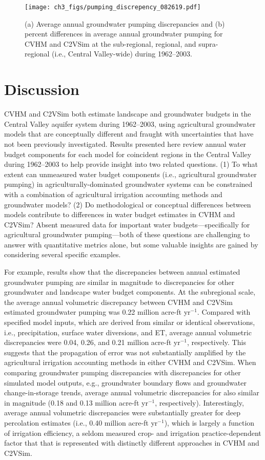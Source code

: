 \begin{figure}[ht!]
\centerline{\texttt{[image: ch3\_figs/pumping\_discrepency\_082619.pdf]}}
\caption{(a) Average annual groundwater pumping discrepancies and (b) percent differences in average annual groundwater pumping for CVHM and C2VSim at the sub-regional, regional, and supra-regional (i.e., Central Valley-wide) during 1962--2003.}
\label{fig:ch3_GW_pumping}
\end{figure}

\section{Discussion}

CVHM and C2VSim both estimate landscape and groundwater budgets in the Central Valley aquifer system during 1962--2003, using agricultural groundwater models that are conceptually different and fraught with uncertainties that have not been previously investigated. Results presented here review annual water budget components for each model for coincident regions in the Central Valley during 1962--2003 to help provide insight into two related questions. (1) To what extent can unmeasured water budget components (i.e., agricultural groundwater pumping) in agriculturally-dominated groundwater systems can be constrained with a combination of agricultural irrigation accounting methods and groundwater models? (2) Do methodological or conceptual differences between models contribute to differences in water budget estimates in CVHM and C2VSim? Absent measured data for important water budgets---specifically for agricultural groundwater pumping---both of these questions are challenging to answer with quantitative metrics alone, but some valuable insights are gained by considering several specific examples.

For example, results show that the discrepancies between annual estimated groundwater pumping are similar in magnitude to discrepancies for other groundwater and landscape water budget components. At the subregional scale, the average annual volumetric discrepancy between CVHM and C2VSim estimated groundwater pumping was 0.22 million acre-ft yr$^{-1}$. Compared with specified model inputs, which are derived from similar or identical observations, i.e., precipitation, surface water diversions, and ET, average annual volumetric discrepancies were 0.04, 0.26, and 0.21 million acre-ft yr$^{-1}$, respectively. This suggests that the propagation of error was not substantially amplified by the agricultural irrigation accounting methods in either CVHM and C2VSim. When comparing groundwater pumping discrepancies with discrepancies for other simulated model outputs, e.g., groundwater boundary flows and groundwater change-in-storage trends, average annual volumetric discrepancies for also similar in magnitude (0.18 and 0.13 million acre-ft yr$^{-1}$, respectively). Interestingly, average annual volumetric discrepancies were substantially greater for deep percolation estimates (i.e., 0.40 million acre-ft yr$^{-1}$), which is largely a function of irrigation efficiency, a seldom measured crop- and irrigation practice-dependent factor that that is represented with distinctly different approaches in CVHM and C2VSim. 

